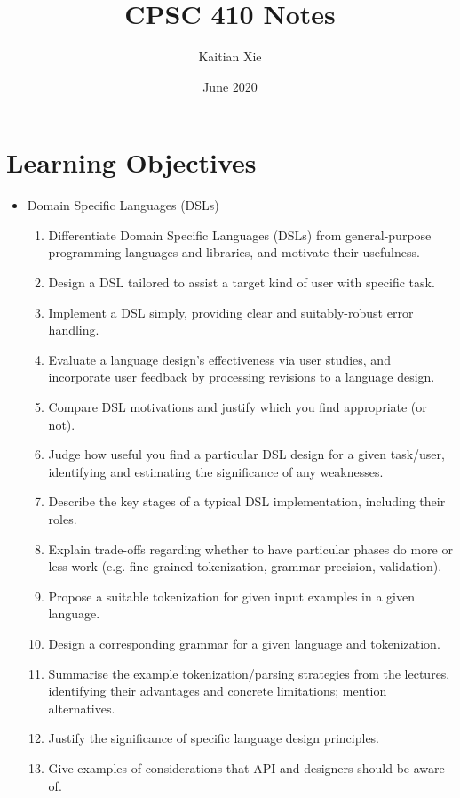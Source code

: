 \documentclass{article}
\title{CPSC 410 Notes}
\author{Kaitian Xie}
\date{June 2020}
\begin{document}
\maketitle
\pagebreak

\tableofcontents
\pagebreak

\section{Learning Objectives}

\begin{itemize}
    \item Domain Specific Languages (DSLs)
    \begin{enumerate}
        \item Differentiate Domain Specific Languages (DSLs) from general-purpose programming languages and libraries, and motivate their usefulness.
        \item Design a DSL tailored to assist a target kind of user with specific task.
        \item Implement a DSL simply, providing clear and suitably-robust error handling.
        \item Evaluate a language design's effectiveness via user studies, and incorporate user feedback by processing revisions to a language design.
        \item Compare DSL motivations and justify which you find appropriate (or not).
        \item Judge how useful you find a particular DSL design for a given task/user, identifying and estimating the significance of any weaknesses.
        \item Describe the key stages of a typical DSL implementation, including their roles.
        \item Explain trade-offs regarding whether to have particular phases do more or less work (e.g. fine-grained tokenization, grammar precision, validation).
        \item Propose a suitable tokenization for given input examples in a given language.
        \item Design a corresponding grammar for a given language and tokenization.
        \item Summarise the example tokenization/parsing strategies from the lectures, identifying their advantages and concrete limitations; mention alternatives.
        \item Justify the significance of specific language design principles.
        \item Give examples of considerations that API and designers should be aware of.

\end{enumerate}
\end{itemize}
\end{document}
